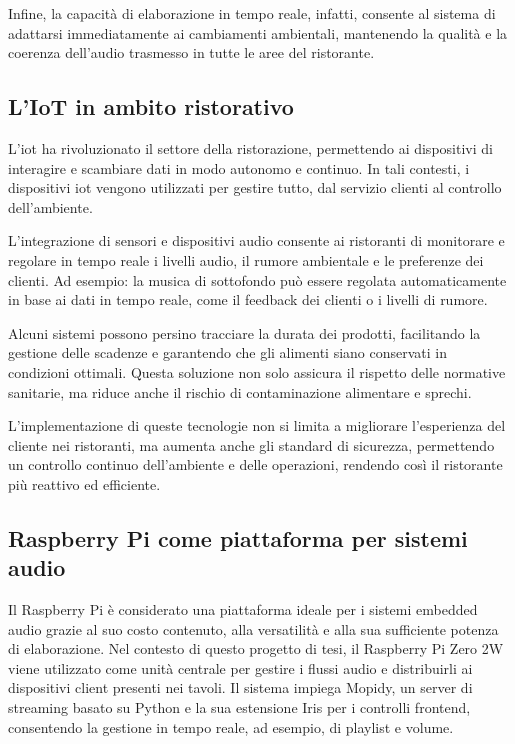 Infine, la capacità di elaborazione in tempo reale, infatti, consente al sistema di adattarsi immediatamente ai cambiamenti ambientali, mantenendo la qualità e la coerenza dell’audio trasmesso in tutte le aree del ristorante.

\newpage
\subsection{L'IoT in ambito ristorativo}
\noindent

L'\gls{iot} ha rivoluzionato il settore della ristorazione, permettendo ai dispositivi di interagire e scambiare dati in modo autonomo e continuo. In tali contesti, i dispositivi \gls{iot} vengono utilizzati per gestire tutto, dal servizio clienti al controllo dell'ambiente.

L'integrazione di sensori e dispositivi audio consente ai ristoranti di monitorare e regolare in tempo reale i livelli audio, il rumore ambientale e le preferenze dei clienti. Ad esempio: la musica di sottofondo può essere regolata automaticamente in base ai dati in tempo reale, come il feedback dei clienti o i livelli di rumore.

Alcuni sistemi possono persino tracciare la durata dei prodotti, facilitando la gestione delle scadenze e garantendo che gli alimenti siano conservati in condizioni ottimali. Questa soluzione non solo assicura il rispetto delle normative sanitarie, ma riduce anche il rischio di contaminazione alimentare e sprechi. \cite{10593159}

L'implementazione di queste tecnologie non si limita a migliorare l'esperienza del cliente nei ristoranti, ma aumenta anche gli standard di sicurezza, permettendo un controllo continuo dell'ambiente e delle operazioni, rendendo così il ristorante più reattivo ed efficiente.
\subsection{Raspberry Pi come piattaforma per sistemi audio}
\noindent

Il Raspberry Pi è considerato una piattaforma ideale per i sistemi embedded audio grazie al suo costo contenuto, alla versatilità e alla sua sufficiente potenza di elaborazione. Nel contesto di questo progetto di tesi, il Raspberry Pi Zero 2W viene utilizzato come unità centrale per gestire i flussi audio e distribuirli ai dispositivi client presenti nei tavoli. Il sistema impiega Mopidy, un server di streaming basato su Python e la sua estensione Iris per i controlli frontend, consentendo la gestione in tempo reale, ad esempio, di playlist e volume.

